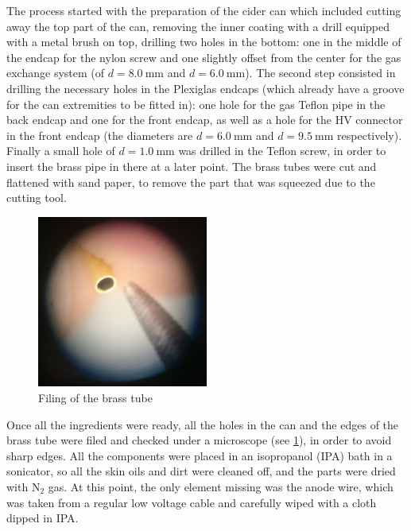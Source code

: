 The process started with the preparation of the cider can which included cutting
away the top part of the can, removing the inner coating with a drill equipped with a
metal brush on top, drilling two holes in the bottom: one in the middle of the
endcap for the nylon screw and one slightly offset from the center for the
gas exchange system (of $d = \SI{8.0}{\milli\meter}$ and $d =
\SI{6.0}{\milli\meter}$). The second step consisted in drilling the necessary
holes in the Plexiglas endcaps (which already have a groove for the can
extremities to be fitted in): one hole for the gas Teflon pipe in the back
endcap and one for the front endcap, as well as a hole for the HV connector in the
front endcap (the diameters are $d = \SI{6.0}{\milli\meter}$ and $d =
\SI{9.5}{\milli\meter}$ respectively). Finally a small hole of $d =
\SI{1.0}{\milli\meter}$ was drilled in the Teflon screw, in order to insert the
brass pipe in there at a later point. The brass tubes were cut and flattened
with sand paper, to remove the part that was squeezed due to the cutting tool.

\begin{figure}[htb]
  \centering
  \includegraphics[width=0.5\textwidth]{./graphics/brass_file.jpg}
  \caption{Filing of the brass tube}
  \label{fig:brass_file}
\end{figure}


Once all the ingredients were ready, all the holes in the can and the edges of
the brass tube were filed and checked under a microscope (see \ref{fig:brass_file}), in order to avoid
sharp edges. All the components were placed in an isopropanol (IPA) bath in a
sonicator, so all the skin oils and dirt were cleaned off, and the parts were
dried with $\mathrm{N}_2$ gas. At this point, the only element missing was the
anode wire, which was taken from a regular low voltage cable and carefully wiped
with a cloth dipped in IPA.



